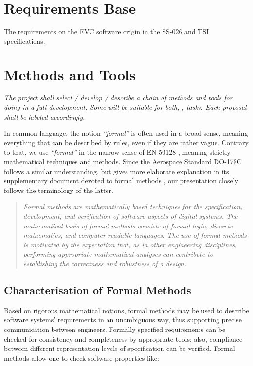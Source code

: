 \documentclass{template/openetcs_report}
\begin{document}
\section{Requirements Base}
\label{sec:requirements-base}

The requirements on the EVC software origin in the SS-026 and TSI
specifications.


\section{\VV Methods and Tools }
\label{sec:methods-tools}

{\it The project shall select / develop / describe a chain of methods
  and tools for doing \vv in a full development. Some will be
  suitable for both, \vv, tasks. Each proposal shall be labeled accordingly.}


In common language, the notion {\em ``formal''} is often used in a
broad sense, meaning everything that can be described by rules, even
if they are rather vague.
%
Contrary to that, we use {\em ``formal''} in the narrow sense of
EN-50128 \cite[Section~D.28]{en50128},
meaning strictly mathematical techniques and methods.
%
Since the Aerospace Standard DO-178C \cite{DO-178C}
follows a similar understanding,
but gives more elaborate explanation in its supplementary document
devoted to formal methods \cite{DO-333},
our presentation closely follows the terminology of the latter.


\begin{quote}
{\em Formal methods are mathematically based techniques for the
specification, development, and verification of software aspects of
digital systems.
%
The mathematical basis of formal methods consists
of formal logic, discrete mathematics, and computer-readable
languages.
%
The use of formal methods is motivated by the expectation
that, as in other engineering disciplines, performing appropriate
mathematical analyses can contribute to establishing the correctness
and robustness of a design.}

\hfill
\cite[Section~1.0, p.1]{DO-333}
\end{quote}


\subsection{Characterisation of Formal Methods}

Based on rigorous mathematical notions, formal methods may be used
to describe software systems' requirements in an unambiguous way,
thus supporting precise communication between engineers.
%
Formally specified requirements can be checked for consistency and
completeness by appropriate tools;
also, compliance between different representation levels of
specification can be verified.
%
Formal methods allow one to check software properties like:
\end{document}
